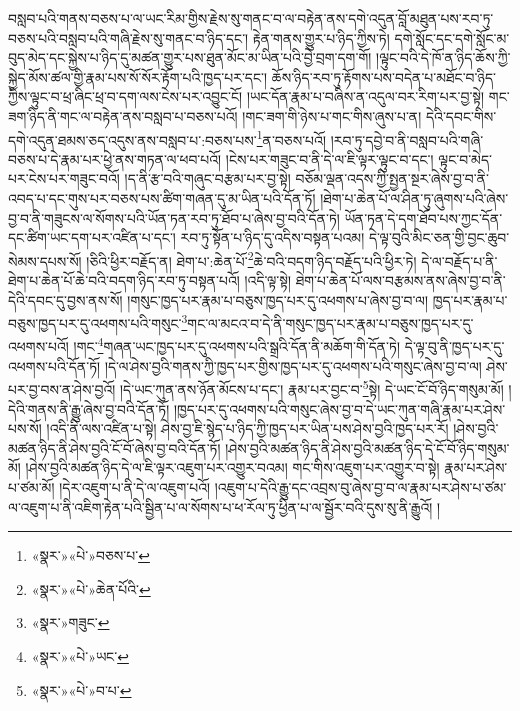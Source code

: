 བསླབ་པའི་གནས་བཅས་པ་ལ་ཡང་རིམ་གྱིས་རྗེས་སུ་གནང་བ་ལ་བརྟེན་ནས་དགེ་འདུན་བློ་མཐུན་པས་རབ་ཏུ་བཅས་པའི་བསླབ་པའི་གཞི་རྗེས་སུ་གནང་བ་ཉིད་དང་། རྟེན་གནས་གྱུར་པ་ཉིད་ཀྱིས་ཏེ། དགེ་སློང་དང་དགེ་སློང་མ་བུད་མེད་དང་སྐྱེས་པ་ཉིད་དུ་མཚན་གྱུར་པས་ཐུན་མོང་མ་ཡིན་པའི་བྱེ་བྲག་དག་གོ། །ལྟུང་བའི་དེ་ཁོ་ན་ཉིད་ཆོས་ཀྱི་སྐྱེད་མོས་ཚལ་གྱི་རྣམ་པས་སོ་སོར་རྟོག་པའི་ཁྱད་པར་དང་། ཆོས་ཉིད་རབ་ཏུ་རྟོགས་པས་བདེན་པ་མཐོང་བ་ཉིད་ཀྱིས་ལྟུང་བ་ཕྲ་ཞིང་ཕྲ་བ་དག་ལས་ངེས་པར་འབྱུང་ངོ། །ཡང་དོན་རྣམ་པ་བཞིས་ན་འདུལ་བར་རིག་པར་བྱ་སྟེ། གང་ཟག་ཉིད་ནི་གང་ལ་བརྟེན་ནས་བསླབ་པ་བཅས་པའོ། །གང་ཟག་གི་ཉེས་པ་གང་གིས་ཞུས་པ་ན། དེའི་དབང་གིས་དགེ་འདུན་ཐམས་ཅད་འདུས་ནས་བསླབ་པ་:བཅས་པས་\footnote{«སྣར་»«པེ་»བཅས་པ་}ན་བཅས་པའོ། །རབ་ཏུ་དབྱེ་བ་ནི་བསླབ་པའི་གཞི་བཅས་པ་དེ་རྣམ་པར་ཕྱེ་ནས་གཏན་ལ་ཕབ་པའོ། །ངེས་པར་གཟུང་བ་ནི་དེ་ལ་ཇི་ལྟར་ལྟུང་བ་དང་། ལྟུང་བ་མེད་པར་ངེས་པར་གཟུང་བའོ། །ད་ནི་རྩ་བའི་གཞུང་བརྩམ་པར་བྱ་སྟེ། བཅོམ་ལྡན་འདས་ཀྱི་སྤྱན་སྔར་ཞེས་བྱ་བ་ནི་འབད་པ་དང་གུས་པར་བཅས་པས་ཚིག་གཞན་དུ་མ་ཡིན་པའི་དོན་ཏོ། །ཐེག་པ་ཆེན་པོ་ལ་ཤིན་ཏུ་ཞུགས་པའི་ཞེས་བྱ་བ་ནི་གཟུངས་ལ་སོགས་པའི་ཡོན་ཏན་རབ་ཏུ་ཐོབ་པ་ཞེས་བྱ་བའི་དོན་ཏེ། ཡོན་ཏན་དེ་དག་ཐོབ་པས་ཀྱང་དོན་དང་ཚིག་ཡང་དག་པར་འཛིན་པ་དང་། རབ་ཏུ་སྟོན་པ་ཉིད་དུ་འདིས་བསྟན་པའམ། དེ་ལྟ་བུའི་མིང་ཅན་གྱི་བྱང་ཆུབ་སེམས་དཔས་སོ། །ཅིའི་ཕྱིར་བརྗོད་ན། ཐེག་པ་:ཆེན་པོ་\footnote{«སྣར་»«པེ་»ཆེན་པོའི་}ཆེ་བའི་བདག་ཉིད་བརྗོད་པའི་ཕྱིར་ཏེ། དེ་ལ་བརྗོད་པ་ནི་ཐེག་པ་ཆེན་པོ་ཆེ་བའི་བདག་ཉིད་རབ་ཏུ་བསྟན་པའོ། །འདི་ལྟ་སྟེ། ཐེག་པ་ཆེན་པོ་ལས་བརྩམས་ནས་ཞེས་བྱ་བ་ནི་དེའི་དབང་དུ་བྱས་ནས་སོ། །གསུང་ཁྱད་པར་རྣམ་པ་བཅུས་ཁྱད་པར་དུ་འཕགས་པ་ཞེས་བྱ་བ་ལ། ཁྱད་པར་རྣམ་པ་བཅུས་ཁྱད་པར་དུ་འཕགས་པའི་གསུང་\footnote{«སྣར་»གཟུང་}གང་ལ་མངའ་བ་དེ་ནི་གསུང་ཁྱད་པར་རྣམ་པ་བཅུས་ཁྱད་པར་དུ་འཕགས་པའོ། །གང་\footnote{«སྣར་»«པེ་»ཡང་}གཞན་ཡང་ཁྱད་པར་དུ་འཕགས་པའི་སྒྲའི་དོན་ནི་མཆོག་གི་དོན་ཏེ། དེ་ལྟ་བུ་ནི་ཁྱད་པར་དུ་འཕགས་པའི་དོན་ཏོ། །དེ་ལ་ཤེས་བྱའི་གནས་ཀྱི་ཁྱད་པར་གྱིས་ཁྱད་པར་དུ་འཕགས་པའི་གསུང་ཞེས་བྱ་བ་ལ། ཤེས་པར་བྱ་བས་ན་ཤེས་བྱའོ། །དེ་ཡང་ཀུན་ནས་ཉོན་མོངས་པ་དང་། རྣམ་པར་བྱང་བ་\footnote{«སྣར་»«པེ་»བ་པ་}སྟེ། དེ་ཡང་ངོ་བོ་ཉིད་གསུམ་མོ། །དེའི་གནས་ནི་རྒྱུ་ཞེས་བྱ་བའི་དོན་ཏོ། །ཁྱད་པར་དུ་འཕགས་པའི་གསུང་ཞེས་བྱ་བ་དེ་ཡང་ཀུན་གཞི་རྣམ་པར་ཤེས་པས་སོ། །འདི་ནི་ལས་འཛིན་པ་སྟེ། ཤེས་བྱ་ཇི་སྙེད་པ་ཉིད་ཀྱི་ཁྱད་པར་ཡིན་པས་ཤེས་བྱའི་ཁྱད་པར་རོ། །ཤེས་བྱའི་མཚན་ཉིད་ནི་ཤེས་བྱའི་ངོ་བོ་ཞེས་བྱ་བའི་དོན་ཏོ། །ཤེས་བྱའི་མཚན་ཉིད་ནི་ཤེས་བྱའི་མཚན་ཉིད་དེ་ངོ་བོ་ཉིད་གསུམ་མོ། །ཤེས་བྱའི་མཚན་ཉིད་དེ་ལ་ཇི་ལྟར་འཇུག་པར་འགྱུར་བའམ། གང་གིས་འཇུག་པར་འགྱུར་བ་སྟེ། རྣམ་པར་ཤེས་པ་ཙམ་མོ། །དེར་འཇུག་པ་ནི་དེ་ལ་འཇུག་པའོ། །འཇུག་པ་དེའི་རྒྱུ་དང་འབྲས་བུ་ཞེས་བྱ་བ་ལ་རྣམ་པར་ཤེས་པ་ཙམ་ལ་འཇུག་པ་ནི་འཇིག་རྟེན་པའི་སྦྱིན་པ་ལ་སོགས་པ་ཕ་རོལ་ཏུ་ཕྱིན་པ་ལ་སྦྱོར་བའི་དུས་སུ་ནི་རྒྱུའོ། །

